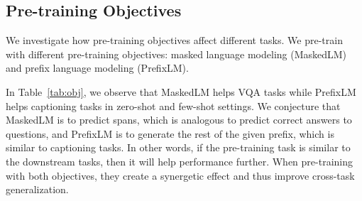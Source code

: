\begin{table}[tb!]
\centering
\caption{\textbf{Results on different pre-training objectives.} We test our pre-training objectives to investigate how it affects zero-shot and few-shot performance. We train \method with 16 training and validation examples.
}
\label{tab:obj}
\end{table}






\subsection{Pre-training Objectives}
\label{sec:exp:obj}



We investigate how pre-training objectives affect different tasks. 
We pre-train \method\xspace with different pre-training objectives: masked language modeling (MaskedLM) and prefix language modeling (PrefixLM).


In Table~\ref{tab:obj}, we observe that MaskedLM helps VQA tasks while PrefixLM helps captioning tasks in zero-shot and few-shot settings. 
We conjecture that MaskedLM is to predict spans, which is analogous to predict correct answers to questions, and PrefixLM is to generate the rest of the given prefix, which is similar to captioning tasks.
In other words, if the pre-training task is similar to the downstream tasks, then it will help performance further.
When pre-training with both objectives, they create a synergetic effect and thus improve cross-task generalization.






























